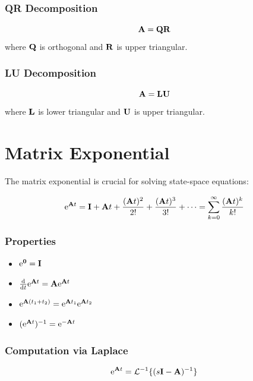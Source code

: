 \subsubsection{QR Decomposition}
\begin{equation}
\mathbf{A} = \mathbf{Q}\mathbf{R}
\end{equation}
where $\mathbf{Q}$ is orthogonal and $\mathbf{R}$ is upper triangular.

\subsubsection{LU Decomposition}
\begin{equation}
\mathbf{A} = \mathbf{L}\mathbf{U}
\end{equation}
where $\mathbf{L}$ is lower triangular and $\mathbf{U}$ is upper triangular.

\section{Matrix Exponential}

The matrix exponential is crucial for solving state-space equations:

\begin{definitionbox}[title=Definition 0.6: Matrix Exponential]
\begin{equation}
\mathrm{e}^{\mathbf{A} t} = \mathbf{I} + \mathbf{A} t + \frac{(\mathbf{A} t)^2}{2!} + \frac{(\mathbf{A} t)^3}{3!} + \cdots = \sum_{k=0}^{\infty} \frac{(\mathbf{A} t)^k}{k!}
\end{equation}
\end{definitionbox}



\subsubsection{Properties}
\begin{itemize}
    \item $\mathrm{e}^{\mathbf{0}} = \mathbf{I}$
    \item $\frac{\mathrm{d}}{\mathrm{d} t}\mathrm{e}^{\mathbf{A} t} = \mathbf{A}\mathrm{e}^{\mathbf{A} t}$
    \item $\mathrm{e}^{\mathbf{A}(t_1+t_2)} = \mathrm{e}^{\mathbf{A} t_1}\mathrm{e}^{\mathbf{A} t_2}$
    \item $(\mathrm{e}^{\mathbf{A} t})^{-1} = \mathrm{e}^{-\mathbf{A} t}$
\end{itemize}

\subsubsection{Computation via Laplace}
\begin{equation}
\mathrm{e}^{\mathbf{A} t} = \mathcal{L}^{-1}\{(s\mathbf{I} - \mathbf{A})^{-1}\}
\end{equation}

